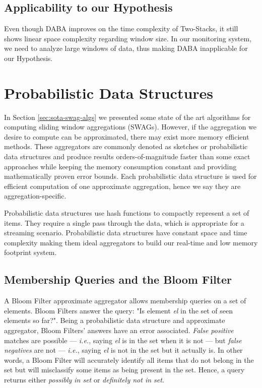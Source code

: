 \subsection*{Applicability to our Hypothesis}
Even though DABA improves on the time complexity of Two-Stacks, it still shows linear space complexity regarding window size. In our monitoring system, we need to analyze large windows of data, thus making DABA inapplicable for our Hypothesis.


\section{Probabilistic Data Structures} \label{sec:pds}
In Section \ref{sec:sota-swag-algs} we presented some state of the art algorithms for computing sliding window aggregations (SWAGs). However, if the aggregation we desire to compute can be approximated, there may exist more memory efficient methods. These aggregators are commonly denoted as sketches or probabilistic data structures and produce results orders-of-magnitude faster than some exact approaches while keeping the memory consumption constant and providing mathematically proven error bounds. Each probabilistic data structure is used for efficient computation of one approximate aggregation, hence we say they are aggregation-specific.

Probabilistic data structures use hash functions to compactly represent a set of items. They require a single pass through the data, which is appropriate for a streaming scenario. Probabilistic data structures have constant space and time complexity \cite{Singh-PDS-BIGD} making them ideal aggregators to build our real-time and low memory footprint system. 

\subsection{Membership Queries and the Bloom Filter} \label{sec:bloom}
A Bloom Filter \cite{BLOOM-BLOOMFILTER} approximate aggregator allows membership queries on a set of elements. Bloom Filters answer the query: "Is element \textit{el} in the set of seen elements so far?". Being a probabilistic data structure and approximate aggregator, Bloom Filters' answers have an error associated. \textit{False positive} matches are possible --- \textit{i.e.}, saying \textit{el} is in the set when it is not --- but \textit{false negatives} are not --- \textit{i.e.}, saying \textit{el} is not in the set but it actually is. In other words, a Bloom Filter will accurately identify all items that do not belong in the set but will misclassify some items as being present in the set. Hence, a query returns either \textit{possibly in set} or \textit{definitely not in set}.

